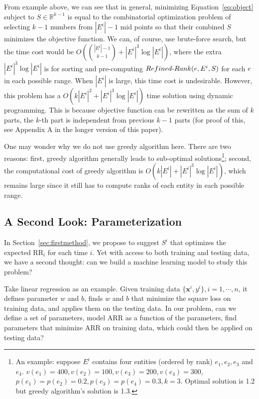 From example above, we can see that in general, minimizing Equation~\ref{eq:object} subject to $S\in \mathbb{R}^{k-1}$ is equal to the combinatorial optimization problem of selecting $k-1$ numbers from $|E^i| - 1$ mid points so that their combined $S$ minimizes the objective function. We can, of course, use brute-force search, but the time cost would be $O({|E^i| - 1 \choose{k-1}} \allowbreak+ |E^i|^3\log{|E^i|})$, where the extra $|E^i|^3\log{|E^i|}$ is for sorting and pre-computing $\mathop{\mbox{$Refined$-$Rank$}}(e, E^i, S)$ for each $e$ in each possible range. When $|E^i|$ is large, this time cost is undesirable. However, this problem has a $O(k|E^i|^2 + |E^i|^3\log{|E^i|})$ time solution using dynamic programming. This is because objective function can be rewritten as the sum of $k$ parts, the $k$-th part is independent from previous $k-1$ parts (for proof of this, see Appendix A in the longer version of this paper).

One may wonder why we do not use greedy algorithm here. There are two reasons: first, greedy algorithm generally leads to sub-optimal solutions\footnote{An example: suppose $E^i$ contains four entities (ordered by rank) $e_1, e_2, e_3$ and $e_4$. $v(e_1)=400, v(e_2)=100, v(e_3)=200, v(e_4)=300$, $p(e_1)=p(e_2)=0.2,p(e_3)=p(e_4)=0.3, k=3$. Optimal solution is 1.2 but greedy algorithm's solution is 1.3.}; second, the computational cost of greedy algorithm is $O(k|E^i| + |E^i|^3\log{|E^i|})$, which remains large since it still has to compute ranks of each entity in each possible range. 

\subsection{A Second Look: Parameterization}
\label{sec:percentage}

In Section~\ref{sec:firstmethod}, we propose to suggest $S^i$ that optimizes the expected RR$_i$ for each time $i$. Yet with access to both training and testing data, we have a second thought: can we build a machine learning model to study this problem? 

Take linear regression as an example. Given training data $\{\mathbf{x}^i, y^i\}, i=1,\cdots, n$, it defines parameter $w$ and $b$, finds $w$ and $b$ that minimize the square loss on training data, and applies them on the testing data. In our problem, can we define a set of parameters, model ARR as a function of the parameters, find parameters that minimize ARR on training data, which could then be applied on testing data?

